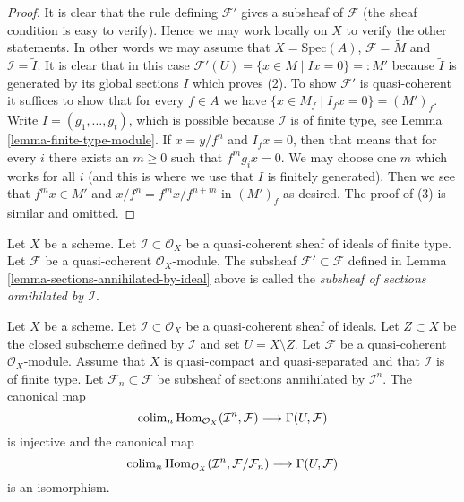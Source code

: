 \begin{proof}
It is clear that the rule defining $\mathcal{F}'$ gives a subsheaf
of $\mathcal{F}$ (the sheaf condition is easy to verify). Hence we
may work locally on $X$ to verify the other statements. In other words
we may assume that $X = \text{Spec}(A)$, $\mathcal{F} = \widetilde{M}$
and $\mathcal{I} = \widetilde{I}$. It is clear that in this case
$\mathcal{F}'(U) = \{x \in M \mid Ix = 0\} =: M'$ because $\widetilde{I}$
is generated by its global sections $I$ which proves (2).
To show $\mathcal{F}'$ is quasi-coherent it suffices to show that
for every $f \in A$ we have
$\{x \in M_f \mid I_f x = 0\} = (M')_f$.
Write $I = (g_1, \ldots, g_t)$, which is possible because $\mathcal{I}$
is of finite type, see Lemma \ref{lemma-finite-type-module}.
If $x = y/f^n$ and $I_fx = 0$, then that means that for every $i$
there exists an $m \geq 0$ such that $f^mg_ix = 0$. 
We may choose one $m$ which works for all $i$ (and this is where we
use that $I$ is finitely generated). Then we see that $f^mx \in M'$
and $x/f^n = f^mx/f^{n + m}$ in $(M')_f$ as desired.
The proof of (3) is similar and omitted.
\end{proof}

\begin{definition}
\label{definition-subsheaf-sections-annihilated-by-ideal}
Let $X$ be a scheme.
Let $\mathcal{I} \subset \mathcal{O}_X$ be a quasi-coherent sheaf of ideals
of finite type.
Let $\mathcal{F}$ be a quasi-coherent $\mathcal{O}_X$-module.
The subsheaf $\mathcal{F}' \subset \mathcal{F}$ defined in
Lemma \ref{lemma-sections-annihilated-by-ideal} above is called
the {\it subsheaf of sections annihilated by $\mathcal{I}$}.
\end{definition}

\begin{lemma}
\label{lemma-sections-over-quasi-compact-open}
Let $X$ be a scheme.
Let $\mathcal{I} \subset \mathcal{O}_X$ be a quasi-coherent sheaf
of ideals. Let $Z \subset X$ be the closed subscheme
defined by $\mathcal{I}$ and set $U = X \setminus Z$.
Let $\mathcal{F}$ be a quasi-coherent $\mathcal{O}_X$-module.
Assume that $X$ is quasi-compact and quasi-separated and
that $\mathcal{I}$ is of finite type.
Let $\mathcal{F}_n \subset \mathcal{F}$
be subsheaf of sections annihilated by $\mathcal{I}^n$.
The canonical map
$$
\mathop{\rm colim}\nolimits_n \text{Hom}_{\mathcal{O}_X}(\mathcal{I}^n,
\mathcal{F})
\longrightarrow
\Gamma(U, \mathcal{F})
$$
is injective and the canonical map
$$
\mathop{\rm colim}\nolimits_n \text{Hom}_{\mathcal{O}_X}(\mathcal{I}^n,
\mathcal{F}/\mathcal{F}_n)
\longrightarrow
\Gamma(U, \mathcal{F})
$$
is an isomorphism.
\end{lemma}

